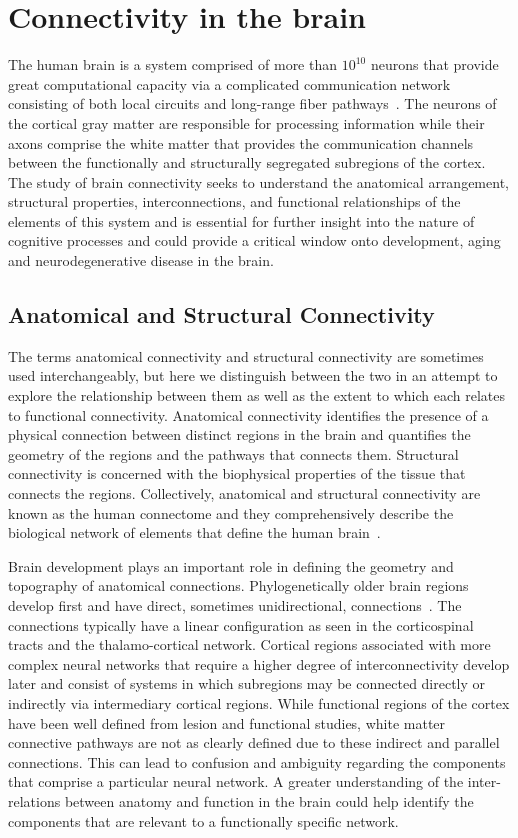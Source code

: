 \section{Connectivity in the brain}
The human brain is a system comprised of more than $10^{10}$ neurons that provide great computational capacity via a complicated communication network consisting of both local circuits and long-range fiber pathways~\cite{Hagmann2008}. The neurons of the cortical gray matter are responsible for processing information while their axons comprise the white matter that provides the communication channels between the functionally and structurally segregated subregions of the cortex. The study of brain connectivity seeks to understand the anatomical arrangement, structural properties, interconnections, and functional relationships of the elements of this system and is essential for further insight into the nature of cognitive processes and could provide a critical window onto development, aging and neurodegenerative disease in the brain.

\subsection{Anatomical and Structural Connectivity}
The terms anatomical connectivity and structural connectivity are sometimes used interchangeably, but here we distinguish between the two in an attempt to explore the relationship between them as well as the extent to which each relates to functional connectivity. Anatomical connectivity identifies the presence of a physical connection between distinct regions in the brain and quantifies the geometry of the regions and the pathways that connects them. Structural connectivity is concerned with the biophysical properties of the tissue that connects the regions. Collectively, anatomical and structural connectivity are known as the human connectome and they comprehensively describe the biological network of elements that define the human brain~\cite{Hagmann2008}. 

Brain development plays an important role in defining the geometry and topography of anatomical connections.
Phylogenetically older brain regions develop first and have direct, sometimes unidirectional, connections~\cite{Gogtay2004b}. The connections typically have a linear configuration as seen in the corticospinal tracts and the thalamo-cortical network. Cortical regions associated with more complex neural networks that require a higher degree of interconnectivity develop later and consist of systems in which subregions may be connected directly or indirectly via intermediary cortical regions. While functional regions of the cortex have been well defined from lesion and functional studies, white matter connective pathways are not as clearly defined due to these indirect and parallel connections. This can lead to confusion and ambiguity regarding the components that comprise a particular neural network. A greater understanding of the inter-relations between anatomy and function in the brain could help identify the components that are relevant to a functionally specific network.

